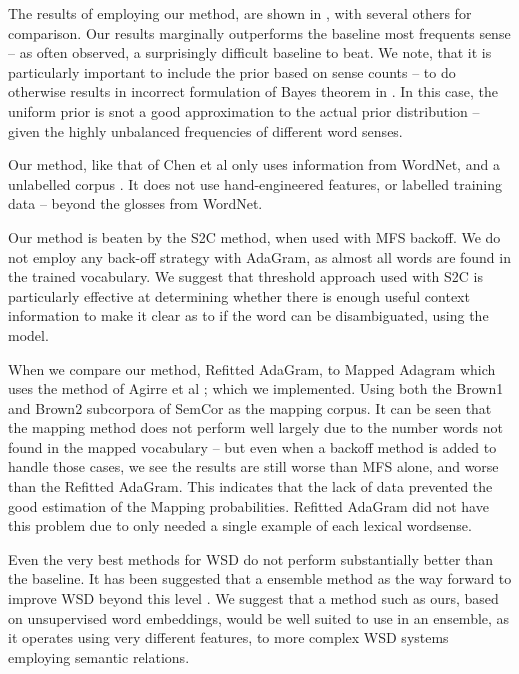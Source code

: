 \documentclass{sig-alternate}
\begin{document}
The results of employing our method, are shown in , with several others for comparison. Our results marginally outperforms the baseline most frequents sense -- as often observed, a surprisingly difficult baseline to beat.
We note, that it is particularly important to include the prior based on sense counts -- to do otherwise results in incorrect formulation of Bayes theorem in . In this case, the uniform prior is snot a good approximation to the actual prior distribution -- given the highly unbalanced frequencies of different word senses. 

Our method, like that of Chen et al only uses information from WordNet, and a unlabelled corpus \parencite{Chen2014}. It does not use hand-engineered features, or labelled training data -- beyond the glosses from WordNet.

Our method is beaten by the S2C method, when used with MFS backoff.
We do not employ any back-off strategy with AdaGram, as almost all words are found in the trained vocabulary. We suggest that threshold approach used with S2C is particularly effective at determining whether there is enough useful context information to make it clear as to if the word can be disambiguated, using the model.


When we compare our method, Refitted AdaGram, to Mapped Adagram which uses the method of Agirre et al \parencite{agirre2006}; which we implemented. Using both the Brown1 and Brown2 subcorpora of SemCor as the mapping corpus.
It can be seen that the mapping method does not perform well largely due to the number words not found in the mapped vocabulary -- but even when a backoff method is added to handle those cases, we see the results are still worse than MFS alone, and worse than the Refitted AdaGram. This indicates that the lack of data prevented the good estimation of the Mapping probabilities. Refitted AdaGram did not have this problem due to only needed a single example of each lexical wordsense.


Even the very best methods for WSD do not perform substantially better than the baseline. It has been suggested that a ensemble method as the way forward to improve WSD beyond this level \cite{saarikoski2006building,saarikoski2006defining}.
We suggest that a method such as ours, based on unsupervised word embeddings, would be well suited to use in an ensemble, as it operates using very different features, to more complex WSD systems employing semantic relations.
\end{document}
